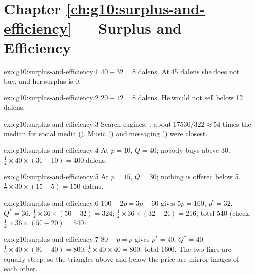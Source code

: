 \section*{Chapter \ref{ch:g10:surplus-and-efficiency} --- Surplus and Efficiency}

\begin{solution}{exo:g10:surplus-and-efficiency:1}
$40 - 32 = 8$ dalens. At 45 dalens she does not buy, and her surplus is 0.
\end{solution}

\begin{solution}{exo:g10:surplus-and-efficiency:2}
$20 - 12 = 8$ dalens. He would not sell below 12 dalens.
\end{solution}

\begin{solution}{exo:g10:surplus-and-efficiency:3}
Search engines, : about $17530/322 \approx 54$ times the median for social media (). Music () and messaging () were
closest.
\end{solution}

\begin{solution}{exo:g10:surplus-and-efficiency:4}
At $p = 10$, $Q = 40$; nobody buys above 30.  $\tfrac12 \times 40 \times (30 - 10) = 400$ dalens.
\end{solution}

\begin{solution}{exo:g10:surplus-and-efficiency:5}
At $p = 15$, $Q = 30$; nothing is offered below 5.  $\tfrac12 \times 30 \times (15 - 5) = 150$ dalens.
\end{solution}

\begin{solution}{exo:g10:surplus-and-efficiency:6}
$100 - 2p = 3p - 60$ gives $5p = 160$, $p^* = 32$, $Q^* = 36$.  $\tfrac12 \times 36 \times (50 - 32) = 324$;  $\tfrac12
\times 36 \times (32 - 20) = 216$; total 540 (check: $\tfrac12 \times 36 \times (50 - 20) = 540$).
\end{solution}

\begin{solution}{exo:g10:surplus-and-efficiency:7}
$80 - p = p$ gives $p^* = 40$, $Q^* = 40$.  $\tfrac12 \times 40 \times (80 - 40) = 800$;  $\tfrac12 \times 40 \times 40 = 800$;
total 1600. The two lines are equally steep, so the triangles above and below the price are mirror images of each other.
\end{solution}

